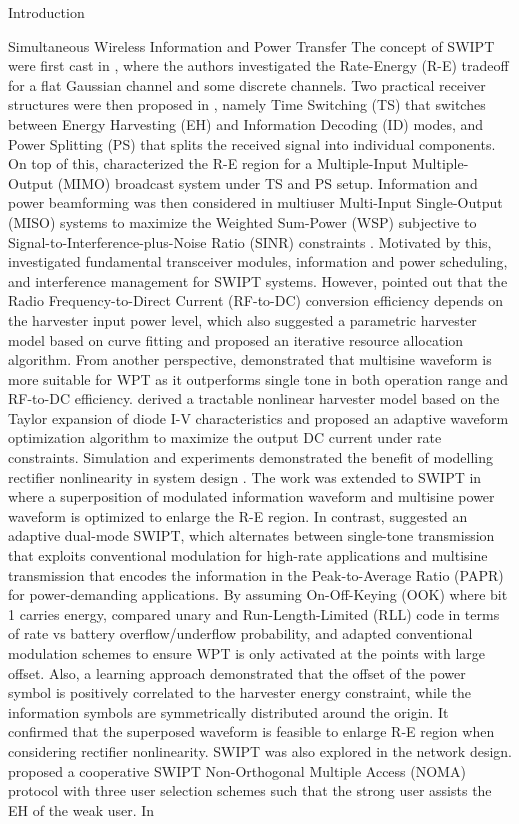 \documentclass{IEEEtran}
\begin{document}
\begin{section}{Introduction}
\begin{subsection}{Simultaneous Wireless Information and Power Transfer}
		The concept of SWIPT were first cast in \cite{Varshney2008}, where the authors investigated the Rate-Energy (R-E) tradeoff for a flat Gaussian channel and some discrete channels. Two practical receiver structures were then proposed in \cite{Zhou2013}, namely Time Switching (TS) that switches between Energy Harvesting (EH) and Information Decoding (ID) modes, and Power Splitting (PS) that splits the received signal into individual components. On top of this, \cite{Zhang2013} characterized the R-E region for a Multiple-Input Multiple-Output (MIMO) broadcast system under TS and PS setup. Information and power beamforming was then considered in multiuser Multi-Input Single-Output (MISO) systems to maximize the Weighted Sum-Power (WSP) subjective to Signal-to-Interference-plus-Noise Ratio (SINR) constraints \cite{Xu2014}. Motivated by this, \cite{Krikidis2014} investigated fundamental transceiver modules, information and power scheduling, and interference management for SWIPT systems. However, \cite{Boshkovska2015} pointed out that the Radio Frequency-to-Direct Current (RF-to-DC) conversion efficiency depends on the harvester input power level, which also suggested a parametric harvester model based on curve fitting and proposed an iterative resource allocation algorithm. From another perspective, \cite{Trotter2009,Boaventura2011} demonstrated that multisine waveform is more suitable for WPT as it outperforms single tone in both operation range and RF-to-DC efficiency. \cite{Clerckx2016a} derived a tractable nonlinear harvester model based on the Taylor expansion of diode I-V characteristics and proposed an adaptive waveform optimization algorithm to maximize the output DC current under rate constraints. Simulation and experiments demonstrated the benefit of modelling rectifier nonlinearity in system design \cite{Kim2019,Kim2019a}. The work was extended to SWIPT in \cite{Clerckx2018} where a superposition of modulated information waveform and multisine power waveform is optimized to enlarge the R-E region. In contrast, \cite{Park2018} suggested an adaptive dual-mode SWIPT, which alternates between single-tone transmission that exploits conventional modulation for high-rate applications and multisine transmission that encodes the information in the Peak-to-Average Ratio (PAPR) for power-demanding applications. By assuming On-Off-Keying (OOK) where bit 1 carries energy, \cite{Hu2019} compared unary and Run-Length-Limited (RLL) code in terms of rate vs battery overflow/underflow probability, and adapted conventional modulation schemes to ensure WPT is only activated at the points with large offset. Also, a learning approach \cite{Varasteh2019c} demonstrated that the offset of the power symbol is positively correlated to the harvester energy constraint, while the information symbols are symmetrically distributed around the origin. It confirmed that the superposed waveform is feasible to enlarge R-E region when considering rectifier nonlinearity. SWIPT was also explored in the network design. \cite{Liu2016} proposed a cooperative SWIPT Non-Orthogonal Multiple Access (NOMA) protocol with three user selection schemes such that the strong user assists the EH of the weak user. In 
\end{subsection}
\end{section}
\end{document}
